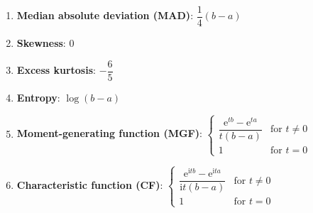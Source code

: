 \begin{enumerate}
    \item \textbf{Median absolute deviation (MAD)}:
    $
        {\displaystyle {\dfrac {1}{4}}(b-a)}
    $
    \hfill \cite{wiki/Continuous_uniform_distribution}

    \item \textbf{Skewness}:
    $0$
    \hfill \cite{wiki/Continuous_uniform_distribution}

    \item \textbf{Excess kurtosis}:
    $ -\dfrac{6}{5}$
    \hfill \cite{wiki/Continuous_uniform_distribution}

    \item \textbf{Entropy}: $ {\displaystyle \log(b-a)} $
    \hfill \cite{wiki/Continuous_uniform_distribution}

    \item \textbf{Moment-generating function (MGF)}:
    $
        {\displaystyle {\begin{cases}{\dfrac {\mathrm {e} ^{tb}-\mathrm {e} ^{ta}}{t(b-a)}}&{\text{for }}t\neq 0\\1&{\text{for }}t=0\end{cases}}}
    $
    \hfill \cite{wiki/Continuous_uniform_distribution}

    \item \textbf{Characteristic function (CF)}:
    $
        {\displaystyle {\begin{cases}{\dfrac {\mathrm {e} ^{\mathrm {i} tb}-\mathrm {e} ^{\mathrm {i} ta}}{\mathrm {i} t(b-a)}}&{\text{for }}t\neq 0\\1&{\text{for }}t=0\end{cases}}}
    $
    \hfill \cite{wiki/Continuous_uniform_distribution}

\end{enumerate}








